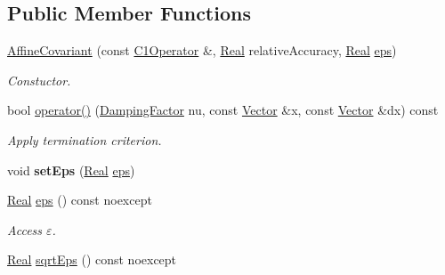 \subsection*{\-Public \-Member \-Functions}
\begin{DoxyCompactItemize}
\item 
\hypertarget{classSpacy_1_1Newton_1_1Termination_1_1AffineCovariant_ab3977d3ebf7737d8f44b1b6beb949eaf}{\hyperlink{classSpacy_1_1Newton_1_1Termination_1_1AffineCovariant_ab3977d3ebf7737d8f44b1b6beb949eaf}{\-Affine\-Covariant} (const \hyperlink{classSpacy_1_1C1Operator}{\-C1\-Operator} \&, \hyperlink{classSpacy_1_1Real}{\-Real} relative\-Accuracy, \hyperlink{classSpacy_1_1Real}{\-Real} \hyperlink{classSpacy_1_1Mixin_1_1Eps_a812b99b0abc1d78a34b4114907f23f52}{eps})}\label{classSpacy_1_1Newton_1_1Termination_1_1AffineCovariant_ab3977d3ebf7737d8f44b1b6beb949eaf}

\begin{DoxyCompactList}\small\item\em \-Constuctor. \end{DoxyCompactList}\item 
bool \hyperlink{classSpacy_1_1Newton_1_1Termination_1_1AffineCovariant_aa33460372120d1ddcd3daf7c79140dcf}{operator()} (\hyperlink{classSpacy_1_1DampingFactor}{\-Damping\-Factor} nu, const \hyperlink{classSpacy_1_1Vector}{\-Vector} \&x, const \hyperlink{classSpacy_1_1Vector}{\-Vector} \&dx) const 
\begin{DoxyCompactList}\small\item\em \-Apply termination criterion. \end{DoxyCompactList}\item 
\hypertarget{classSpacy_1_1Mixin_1_1Eps_a6b4c38a60848c0ab665fb3a81e181786}{void {\bfseries set\-Eps} (\hyperlink{classSpacy_1_1Real}{\-Real} \hyperlink{classSpacy_1_1Mixin_1_1Eps_a812b99b0abc1d78a34b4114907f23f52}{eps})}\label{classSpacy_1_1Mixin_1_1Eps_a6b4c38a60848c0ab665fb3a81e181786}

\item 
\hypertarget{classSpacy_1_1Mixin_1_1Eps_a812b99b0abc1d78a34b4114907f23f52}{\hyperlink{classSpacy_1_1Real}{\-Real} \hyperlink{classSpacy_1_1Mixin_1_1Eps_a812b99b0abc1d78a34b4114907f23f52}{eps} () const noexcept}\label{classSpacy_1_1Mixin_1_1Eps_a812b99b0abc1d78a34b4114907f23f52}

\begin{DoxyCompactList}\small\item\em \-Access $\varepsilon$. \end{DoxyCompactList}\item 
\hypertarget{classSpacy_1_1Mixin_1_1Eps_abd50a47b32614a950189855775a09d05}{\hyperlink{classSpacy_1_1Real}{\-Real} \hyperlink{classSpacy_1_1Mixin_1_1Eps_abd50a47b32614a950189855775a09d05}{sqrt\-Eps} () const noexcept}\label{classSpacy_1_1Mixin_1_1Eps_abd50a47b32614a950189855775a09d05}


\end{DoxyCompactItemize}
